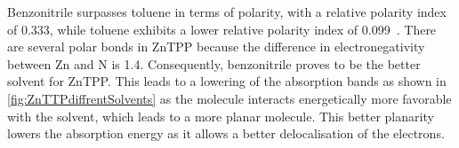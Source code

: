 

Benzonitrile surpasses toluene in terms of polarity, with a relative polarity index of 0.333, while toluene exhibits a lower relative polarity index of 0.099~\cite{Reichardt.2004}. There are several polar bonds in ZnTPP because the difference in electronegativity between Zn and N is 1.4.
Consequently, benzonitrile proves to be the better solvent for ZnTPP. This leads to a lowering of the absorption bands as shown in \cref{fig:ZnTTPdiffrentSolvents} as the molecule interacts energetically more favorable with the solvent, which leads to a more planar molecule. This better planarity 
lowers the absorption energy as it allows a better delocalisation of the electrons.

